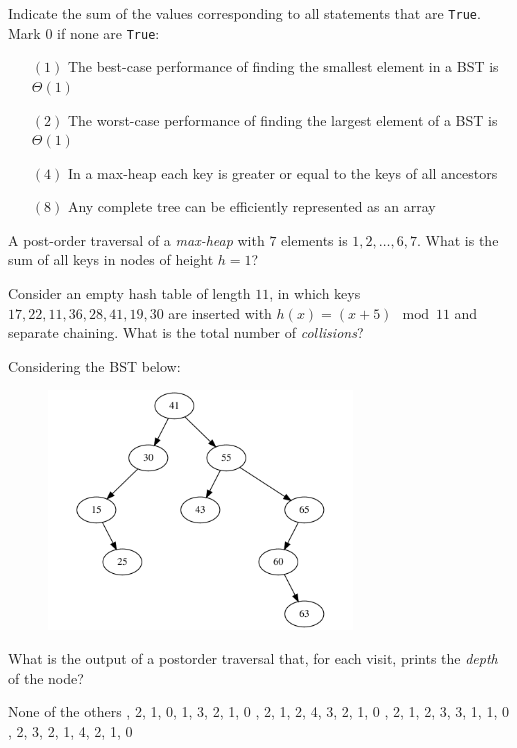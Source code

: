 \documentclass[12pt,addpoints]{exam}
\begin{document}
\pagebreak

\begin{questions}

\question[5] 
Indicate the sum of the values corresponding to all statements that are \verb|True|.  Mark $0$ if none are \verb|True|:
\begin{itemize}
	\item[$(1)$] The best-case performance of finding the smallest element in a BST is $\Theta(1)$
	\item[$(2)$] The worst-case performance of finding the largest element of a BST is $\Theta(1)$
	\item[$(4)$] In a max-heap each key is greater or equal to the keys of all ancestors
	\item[$(8)$] Any complete tree can be efficiently represented as an array\end{itemize}
\answerline

\question[5] 
A post-order traversal of a {\it max-heap} with $7$ elements is $1,2,\dots,6,7$.  What is the sum of all keys in nodes of height $h=1$?
\answerline

\question[5] 
Consider an empty hash table of length $11$, in which keys $17,22,11,36,28,41,19,30$ are inserted with $h(x)=(x+5) \mod 11$ and separate chaining.  What is the total number of {\it collisions}?
\answerline

\question[5] Considering the BST below:
\begin{figure}[h!]
  \centering
  \includegraphics[height=2.5in]{imgs/bst.pdf}
\end{figure}

What is the output of a postorder traversal that, for each visit, prints the {\it depth} of the node?
\begin{choices}	
	\choice None of the others	
	, 2, 1, 0, 1, 3, 2, 1, 0	
	, 2, 1, 2, 4, 3, 2, 1, 0	
	, 2, 1, 2, 3, 3, 1, 1, 0	
	, 2, 3, 2, 1, 4, 2, 1, 0
\end{choices}
\answerline


\end{questions}
\end{document}
